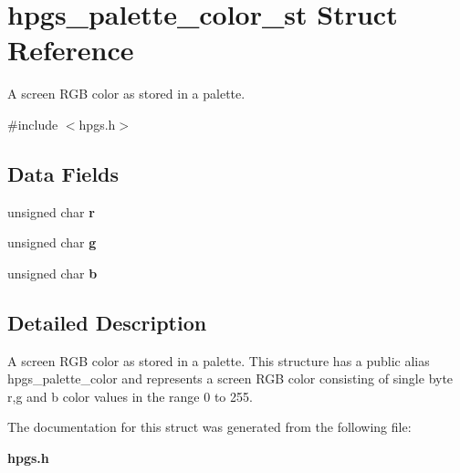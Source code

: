 \section{hpgs\_\-palette\_\-color\_\-st Struct Reference}
\label{structhpgs__palette__color__st}


A screen RGB color as stored in a palette.  




{\ttfamily \#include $<$hpgs.h$>$}

\subsection*{Data Fields}
\begin{DoxyCompactItemize}
\item 
unsigned char {\bfseries r}\label{structhpgs__palette__color__st_a4c1c1cc206462ddf3859578221011dbb}

\item 
unsigned char {\bfseries g}\label{structhpgs__palette__color__st_a7c7f8e4b90a61257de498677d0441f60}

\item 
unsigned char {\bfseries b}\label{structhpgs__palette__color__st_a05b25a11373ddb61f6102fdb8ba4ba37}

\end{DoxyCompactItemize}


\subsection{Detailed Description}
A screen RGB color as stored in a palette. This structure has a public alias {\ttfamily hpgs\_\-palette\_\-color} and represents a screen RGB color consisting of single byte r,g and b color values in the range 0 to 255. 

The documentation for this struct was generated from the following file:\begin{DoxyCompactItemize}
\item 
{\bf hpgs.h}\end{DoxyCompactItemize}
